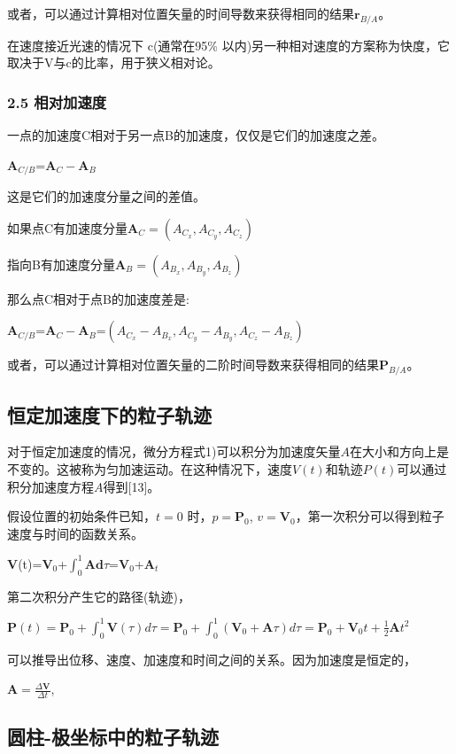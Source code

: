 或者，可以通过计算相对位置矢量的时间导数来获得相同的结果$\mathbf{r}_{B/A}$。

在速度接近光速的情况下 c(通常在95\% 以内)另一种相对速度的方案称为快度，它取决于V与c的比率，用于狭义相对论。

\subsubsection{2.5 相对加速度}

一点的加速度C相对于另一点B的加速度，仅仅是它们的加速度之差。

$\mathbf{A}_{C/B}$=$\mathbf{A}_{C}-\mathbf{A}_{B}$

这是它们的加速度分量之间的差值。


如果点C有加速度分量$\mathbf{A}_{C}=(A_{C_x},A_{C_y},A_{C_z})$

指向B有加速度分量$\mathbf{A}_{B}=(A_{B_x},A_{B_y},A_{B_z})$

那么点C相对于点B的加速度差是:

$\mathbf{A}_{C/B}$=$\mathbf{A}_{C}-\mathbf{A}_{B}$=$(A_{C_x}-A_{B_x},A_{C_y}-A_{B_y},A_{C_z}-A_{B_z})$

或者，可以通过计算相对位置矢量的二阶时间导数来获得相同的结果$\mathbf{P}_{B/A}$。

\subsection{恒定加速度下的粒子轨迹}

对于恒定加速度的情况，微分方程式1)可以积分为加速度矢量${A}$在大小和方向上是不变的。这被称为匀加速运动。在这种情况下，速度$V(t)$和轨迹$P(t)$可以通过积分加速度方程$A$得到[13]。

假设位置的初始条件已知，$t=0$ 时，$p=\mathbf{P}_0$, $v=\mathbf{V}_0$，第一次积分可以得到粒子速度与时间的函数关系。

$\mathbf{V}$(t)=$\mathbf{V}_{0}$+$\int_{0}^{1}\mathbf{Ad}\tau$=$\mathbf{V}_{0}$+$\mathbf{A}_{t}$

第二次积分产生它的路径(轨迹)，

$\mathbf{P}(t)=\mathbf{P}_{0}+\int_{0}^{1}\mathbf{V}(\tau )d\tau=\mathbf{P}_{0}+\int_{0}^{1}(\mathbf{V}_{0}+\mathbf{A}\tau)d\tau=\mathbf{P}_{0}+\mathbf{V}_{0}t+\frac{1}{2}\mathbf{A}t^2$

可以推导出位移、速度、加速度和时间之间的关系。因为加速度是恒定的，

$\mathbf{A} = \frac{\Delta \mathbf{V}}{\Delta t}$,

\subsection{圆柱-极坐标中的粒子轨迹}



